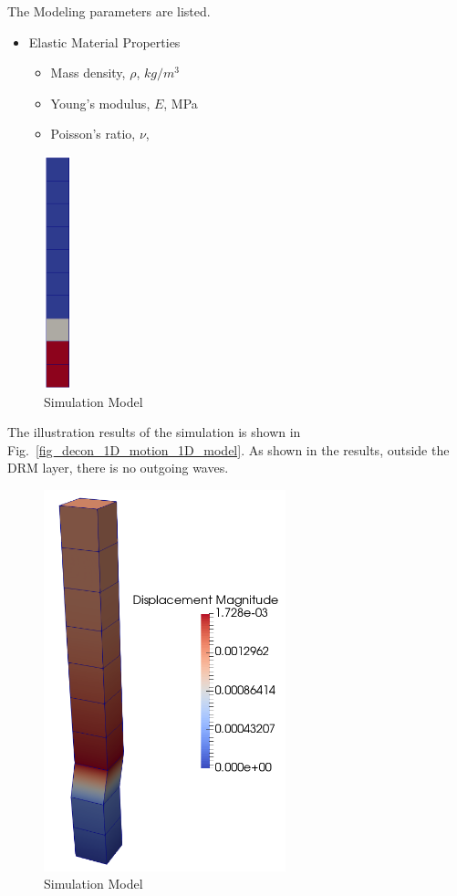 The Modeling parameters are listed.
\begin{itemize}
  \item Elastic Material Properties 
  \begin{itemize}
    \item Mass density, $\rho$, \enspace {} $kg/m^3$
    \item Young's modulus, $E$, \enspace {} MPa
    \item Poisson's ratio, $\nu$, \enspace {}
  \end{itemize}
\end{itemize}

\begin{figure}[H]
  \centering
  \includegraphics[width = 0.8cm]{./Figure-files/Day2/Deconvolution_3by1D_Motions/Free_fields_1D_model_with_DRM/overview.png}
  \caption{Simulation Model}
  \label{fig_decon_1D_motion_1D_model2}
\end{figure}

The illustration results of the simulation is shown in Fig.~\ref{fig_decon_1D_motion_1D_model}.
As shown in the results, outside the DRM layer, there is no outgoing waves. 

\begin{figure}[H]
  \centering
  \includegraphics[width = 7cm]{./Figure-files/Day2/Deconvolution_3by1D_Motions/Free_fields_1D_model_with_DRM/DRM1D_Motion3D.png}
  \caption{Simulation Model}
  \label{fig_decon_3D_motion_1D_model_results}
\end{figure}


